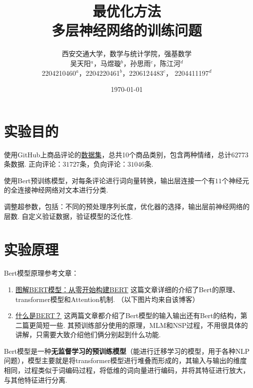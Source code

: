 \documentclass[12pt, a4paper, oneside]{ctexart}
\numberwithin{equation}{section}  %
\begin{document}
\title{最优化方法\\多层神经网络的训练问题}
\author{
西安交通大学，数学与统计学院，强基数学\\[3ex]
吴天阳$^a$，马煜璇$^b$，孙思雨$^c$，陈江河$^d$\\[1ex]
2204210460$^a$，2204220461$^b$，2206124483$^c$， 2204411197$^d$\\[2ex]
}
\date{\today}
\maketitle %
\clearpage %
\tableofcontents %

\clearpage
\section{实验目的}
使用GitHub上商品评论的\href{https://github.com/SophonPlus/ChineseNlpCorpus/blob/master/datasets/online_shopping_10_cats/intro.ipynb}{数据集}，总共10个商品类别，包含两种情绪，总计$62773$条数据. 正向评论：$31727$条，负向评论：$31046$条.

使用Bert预训练模型，对每条评论进行词向量转换，输出层连接一个有$11$个神经元的全连接神经网络对文本进行分类.

调整超参数，包括：不同的预处理序列长度，优化器的选择，输出层前神经网络的层数. 自定义验证数据，验证模型的泛化性.
\section{实验原理}
Bert模型原理参考文章：

\begin{enumerate}
\def\labelenumi{\arabic{enumi}.}
\item
  \href{https://cloud.tencent.com/developer/article/1389555}{图解BERT模型：从零开始构建BERT}
  这篇文章详细的介绍了Bert的原理、transformer模型和Attention机制.
  （以下图片均来自该博客）
\item
  \href{https://zhuanlan.zhihu.com/p/98855346}{什么是BERT？}
  这两篇文章都介绍了Bert模型的输入输出还有Bert的结构，第二篇更简短一些.
  其预训练部分使用的原理，MLM和NSP过程，不用很具体的讲解，只需要大致介绍他们俩分别起到什么功能.
\end{enumerate}

Bert模型是一种\textbf{无监督学习的预训练模型}（能进行迁移学习的模型，用于各种NLP问题），模型主要就是将transformer模型进行堆叠而形成的，其输入与输出的维度相同，过程类似于词编码过程，将低维的词向量进行编码，并将其特征进行放大，与其他特征进行分离.
\end{document}

